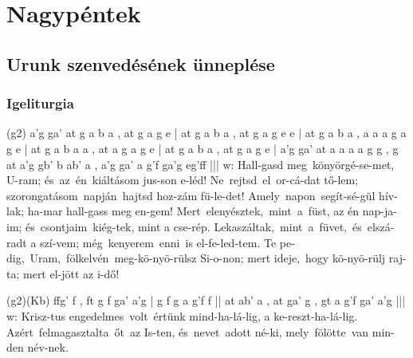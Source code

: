 \documentclass[twoside]{article}
\begin{document}

\section*{Nagypéntek}

\subsection*{Urunk szenvedésének ünneplése}


\subsubsection*{Igeliturgia}



\begin{aretino}
(g2) a'g ga' at g a b a , at g a g e | at g a b a , at g a g e e | at g a b a , a a a g a g e | at g a b a a , at a g a g e | at g a b a , at g a g e | a'g ga' at a a a a g g , g at a'g gb' b ab' a , a'g ga' a g'f ga'g eg'ff |||
w: Hall-gasd meg~könyörgé-se-met, U-ram; és~az~én~kiáltásom jus-son e-léd! Ne~rejtsd~el~or-cá-dat tő-lem; szorongatásom~napján~hajtsd hoz-zám fü-le-det! Amely~napon~segít-sé-gül hív-lak; ha-mar hall-gass meg en-gem! Mert~elenyésztek,~mint~a~füst, az én nap-ja-im; és~csontjaim~kiég-tek, mint a cse-rép. Lekaszáltak,~mint~a~füvet,~és~elszá-radt a szí-vem; még~kenyerem~enni~is el-fe-led-tem. Te pe-dig,~Uram,~fölkelvén~meg-kö-nyö-rülsz Si-o-non; mert ideje,~hogy kö-nyö-rülj raj-ta; mert el-jött az i-dő!
\end{aretino}



\begin{aretino}
(g2)(Kb) ffg' f , ft g f ga' a'g | g f g a g'f f || at ab' a , at ga' g , gt a g'f ga' a'g |||
w: Krisz-tus engedelmes~volt~értünk mind-ha-lá-lig, a ke-reszt-ha-lá-lig. Azért~felmagasztalta~őt~az Is-ten, és~nevet~adott né-ki, mely~fölötte~van min-den név-nek.
\end{aretino}
\end{document}
